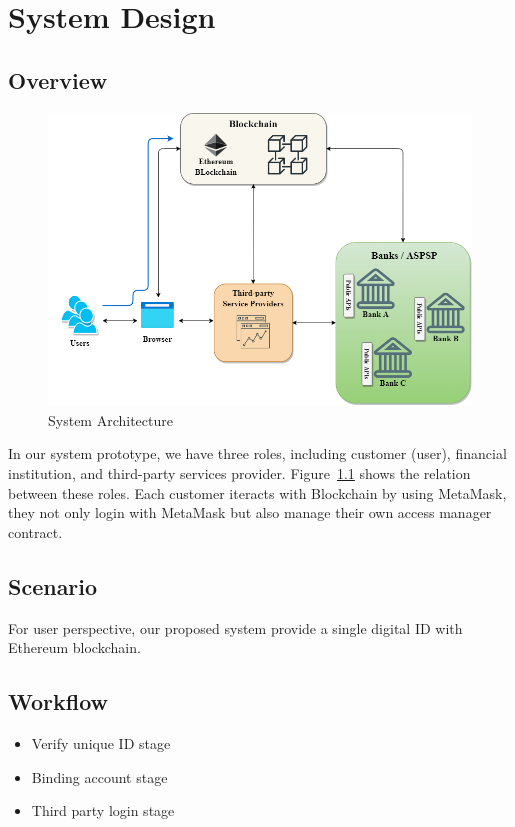 \chapter{System Design}
\label{chapter:design}

\section{Overview}

\begin{figure}[hb]
    \centering
    \includegraphics[height=!,width=1\linewidth,keepaspectratio=true]{figures/system architecture-banks.png}
    \caption{{\footnotesize System Architecture}}
    \label{fig:system_architecture}
\end{figure}

    In our system prototype, we have three roles, including customer (user), financial institution, and third-party services provider. Figure~\ref{fig:system_architecture} shows the relation between these roles. Each customer iteracts with Blockchain by using MetaMask, they not only login with MetaMask but also manage their own access manager contract.

\section{Scenario}

    For user perspective, our proposed system provide a single digital ID with Ethereum blockchain.

\section{Workflow}
\begin{itemize}
    \item Verify unique ID stage
    \item Binding account stage
    \item Third party login stage
\end{itemize}
